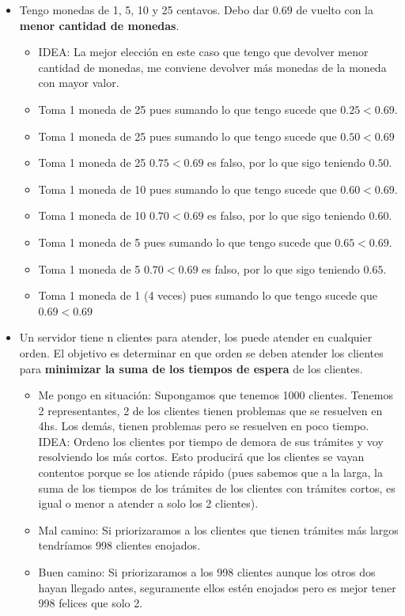\documentclass[10pt,a4paper]{article}
\begin{document}
\begin{itemize}
    \item Tengo monedas de 1, 5, 10 y 25 centavos. Debo dar $0.69$ de vuelto con la \textbf{menor cantidad de monedas}. 
    \begin{itemize}
        \item IDEA: La mejor elección en este caso que tengo que devolver menor cantidad de monedas, me conviene devolver más monedas de la moneda con mayor valor. 
        \item Toma 1 moneda de 25 pues sumando lo que tengo sucede que $0.25<0.69$.
        \item Toma 1 moneda de 25 pues sumando lo que tengo sucede que $0.50<0.69$
        \item Toma 1 moneda de 25 $0.75<0.69$ es falso, por lo que sigo teniendo $0.50$.
        \item Toma 1 moneda de 10 pues sumando lo que tengo sucede que $0.60<0.69$.
        \item Toma 1 moneda de 10 $0.70<0.69$ es falso, por lo que sigo teniendo $0.60$.
        \item Toma 1 moneda de 5 pues sumando lo que tengo sucede que $0.65<0.69$.
        \item Toma 1 moneda de 5 $0.70<0.69$ es falso, por lo que sigo teniendo $0.65$.
        \item Toma 1 moneda de 1 (4 veces) pues sumando lo que tengo sucede que $0.69<0.69$
    \end{itemize}
    \item Un servidor tiene n clientes para atender, los puede atender en cualquier orden. El objetivo es determinar en que orden se deben atender los clientes para \textbf{minimizar la suma de los tiempos de espera} de los clientes. 
    \begin{itemize}
        \item Me pongo en situación: Supongamos que tenemos 1000 clientes. Tenemos 2 representantes, 2 de los clientes tienen problemas que se resuelven en 4hs. Los demás, tienen problemas pero se resuelven en poco tiempo. IDEA: Ordeno los clientes por tiempo de demora de sus trámites y voy resolviendo los más cortos. Esto producirá que los clientes se vayan contentos porque se los atiende rápido (pues sabemos que a la larga, la suma de los tiempos de los trámites de los clientes con trámites cortos, es igual o menor a atender a solo los 2 clientes).
        \item Mal camino: Si priorizaramos a los clientes que tienen trámites más largos tendríamos 998 clientes enojados. 
        \item Buen camino: Si priorizaramos a los 998 clientes aunque los otros dos hayan llegado antes, seguramente ellos estén enojados pero es mejor tener 998 felices que solo 2.
    \end{itemize}
\end{itemize}
\end{document}
